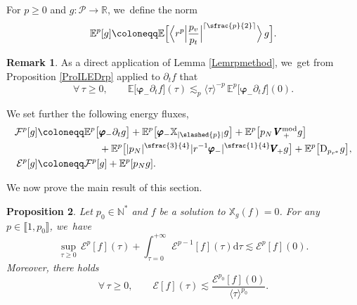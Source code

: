 \documentclass[10pt]{amsart}
\theoremstyle{plain}
\newtheorem{proposition}{Proposition}[section]
\theoremstyle{definition}
\newtheorem{remark}[proposition]{Remark}
\newcommand\R{{\mathbb{R}}}
\newcommand\T{{\mathbb{X}}}
\newcommand\dr{{\mathrm{d}}}
\begin{document}
For $p \geq 0$ and $g \colon \mathcal{P} \to \R$, we~define the norm
\[
\mathbb{E}^p[g] \coloneqq \mathbb{E} \Bigl[ \Big\langle r^{p} \Big| \frac{p_v}{p_t} \Big|^{\lceil \sfrac{p}{2} \rceil} \Big\rangle \, g \Bigr].
\]

\begin{remark}
As a direct application of Lemma \ref{Lemrpmethod}, we~get from Proposition \ref{ProILEDrp} applied to $\partial_t f$ that
\[
\forall \, \tau \geq 0, \qquad \mathbb{E} \bigl[ \pmb{\varphi}_- \partial_t f \bigr] (\tau) \lesssim_p \langle \tau \rangle^{-p} \, \mathbb{E}^p \bigl[ \pmb{\varphi}_- \partial_t f \bigr](0).
\]
\end{remark}

We set further the following energy fluxes,
\begin{align*}
\mathcal{F}^p[g] & \coloneqq \mathbb{E}^p \bigl[ \pmb{\varphi}_- \partial_t g \bigr] +\mathbb{E}^p \bigl[ \pmb{\varphi}_- \T_{|\slashed{p}|} g \bigr] + \mathbb{E}^p \bigl[ p_N \, \pmb{V}_{\,+}^{\mathrm{mod}} g \bigr] \\
& \hspace*{2.2cm}+\mathbb{E}^p \bigl[ |p_N|^{\sfrac{3}{4}} | r^{-1} \pmb{\varphi}_-|^{\sfrac{1}{4}} \pmb{V}_{\! +} g \bigr] +\mathbb{E}^p \bigl[ \mathrm{D}_{p_{r^*}} g \bigr], \\
\mathcal{E}^p [g] & \coloneqq \mathcal{F}^p[g]+\mathbb{E}^p[p_Ng].
\end{align*}

We now prove the main result of this section.

\begin{proposition}\label{Propdecayrp}
Let $p_0 \in \mathbb{N}^*$ and $f$ be a solution to $\T_g(f)=0$. For any $p \in \llbracket 1,p_0 \rrbracket$, we~have\vspace*{-3pt}
\begin{equation}\label{equation:daou}
\sup_{\tau \geq 0} \, \mathcal{E}^p[f](\tau) + \int_{\tau=0}^{+\infty} \mathcal{E}^{p-1}[f](\tau) \dr \tau \lesssim \mathcal{E}^p[f](0).
\end{equation}
Moreover, there holds\vspace*{-3pt}
\begin{equation}\label{prop_decay_flux}
\forall \, \tau \geq 0, \qquad \mathcal{E}[f](\tau) \lesssim \frac{\mathcal{E}^{p_0}[f](0)}{\langle \tau \rangle^{p_0}}.
\end{equation}
\end{proposition}
\end{document}
